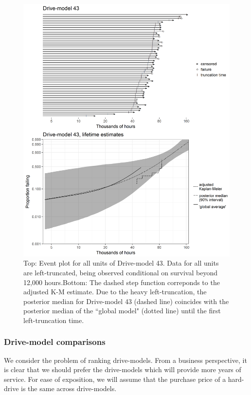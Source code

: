 \documentclass[12pt]{article}
\begin{document}
\begin{figure}
\centering
\includegraphics[height=.8\textheight]{dm43-shrinkage.png}
\caption{\footnotesize Top: Event plot for all units of Drive-model 43. Data for all units are left-truncated, being observed conditional on survival beyond 12,000 hours.\hspace{\textwidth}Bottom: The dashed step function correponds to the adjusted K-M estimate. Due to the heavy left-truncation, the posterior median for Drive-model 43 (dashed line) coincides with the posterior median of the ``global model" (dotted line) until the first left-truncation time.}
\label{fig:ex-mod-43}
\end{figure}

\subsubsection{Drive-model comparisons}
\label{subsubsec:Drive-model comparisons}
We consider the problem of ranking drive-models. From a
business perspective, it is clear
that we should prefer the drive-models which will provide more years
of service. For ease of exposition, we will assume that the purchase
price of a hard-drive is the same across drive-models.
\end{document}
